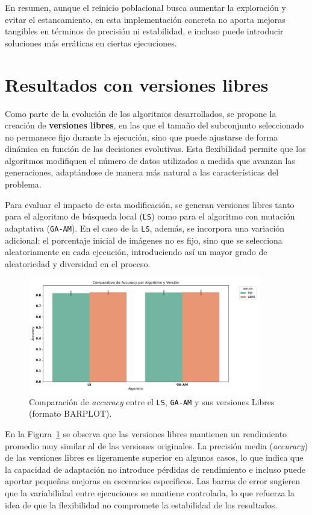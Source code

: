 En resumen, aunque el reinicio poblacional busca aumentar la exploración y evitar el estancamiento,
en esta implementación concreta no aporta mejoras tangibles en términos de precisión ni estabilidad,
e incluso puede introducir soluciones más erráticas en ciertas ejecuciones.

\section{Resultados con versiones libres}\label{sec:resultados-versiones-libres}
Como parte de la evolución de los algoritmos desarrollados, se propone la creación de \textbf{versiones libres},
en las que el tamaño del subconjunto seleccionado no permanece fijo durante la ejecución, sino que puede ajustarse de forma dinámica en función de las decisiones evolutivas.
Esta flexibilidad permite que los algoritmos modifiquen el número de datos utilizados a medida que avanzan las generaciones,
adaptándose de manera más natural a las características del problema.

Para evaluar el impacto de esta modificación, se generan versiones libres tanto para el algoritmo de búsqueda local (\texttt{LS})
como para el algoritmo con mutación adaptativa (\texttt{GA-AM}).
En el caso de la \texttt{LS}, además, se incorpora una variación adicional: el porcentaje inicial de imágenes no es fijo,
sino que se selecciona aleatoriamente en cada ejecución, introduciendo así un mayor grado de aleatoriedad y diversidad en el proceso.


\begin{figure}[htp]
  \centering
  \includegraphics[width=0.9\textwidth]{imagenes/evaluaciones/libres/barplot_por_algoritmo.png}
  \caption{Comparación de \textit{accuracy} entre el \texttt{LS}, \texttt{GA-AM} y sus versiones Libres (formato BARPLOT).}
  \label{fig:barplot_por_algoritmo-libres}
\end{figure}

En la Figura~\ref{fig:barplot_por_algoritmo-libres} se observa que las versiones libres mantienen un rendimiento promedio muy similar al de las versiones originales.
La precisión media (\textit{accuracy}) de las versiones libres es ligeramente superior en algunos casos,
lo que indica que la capacidad de adaptación no introduce pérdidas de rendimiento e incluso puede aportar pequeñas mejoras en escenarios específicos.
Las barras de error sugieren que la variabilidad entre ejecuciones se mantiene controlada,
lo que refuerza la idea de que la flexibilidad no compromete la estabilidad de los resultados.


